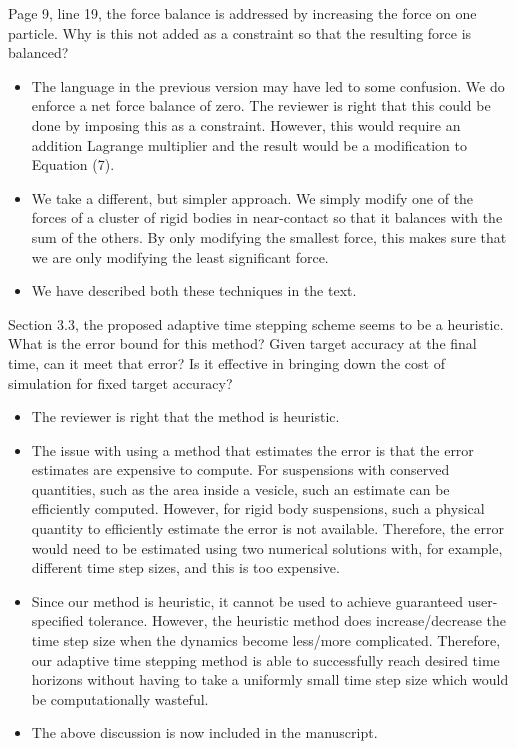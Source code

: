 \documentclass[11pt]{article}
\newcommand{\comment}[1]{{\color{blue} #1}}
\begin{document}
\noindent
\comment{Page 9, line 19, the force balance is addressed by increasing
the force on one particle.  Why is this not added as a constraint so
that the resulting force is balanced?}
\begin{itemize}
  \item The language in the previous version may have led to some
    confusion.  We do enforce a net force balance of zero.  The reviewer
    is right that this could be done by imposing this as a constraint.
    However, this would require an addition Lagrange multiplier and the
    result would be a modification to Equation (7).  
    
  \item We take a different, but simpler approach.  We simply modify one
    of the forces of a cluster of rigid bodies in near-contact so that
    it balances with the sum of the others.  By only modifying the
    smallest force, this makes sure that we are only modifying the least
    significant force.

  \item We have described both these techniques in the text.

\end{itemize}

\noindent
\comment{Section 3.3, the proposed adaptive time stepping scheme seems
  to be a heuristic.  What is the error bound for this method?  Given
  target accuracy at the final time, can it meet that error?  Is it
  effective in bringing down the cost of simulation for fixed target
accuracy?}
\begin{itemize}
  \item The reviewer is right that the method is heuristic.

  \item The issue with using a method that estimates the error is that
    the error estimates are expensive to compute.  For suspensions with
    conserved quantities, such as the area inside a vesicle, such an
    estimate can be efficiently computed.  However, for rigid body
    suspensions, such a physical quantity to efficiently estimate the
    error is not available.  Therefore, the error would need to be
    estimated using two numerical solutions with, for example, different
    time step sizes, and this is too expensive.  

  \item Since our method is heuristic, it cannot be used to achieve
    guaranteed user-specified tolerance.  However, the heuristic method
    does increase/decrease the time step size when the dynamics become
    less/more complicated.  Therefore, our adaptive time stepping method
    is able to successfully reach desired time horizons without having
    to take a uniformly small time step size which would be
    computationally wasteful.

  \item The above discussion is now included in the manuscript.

\end{itemize}
\end{document}

